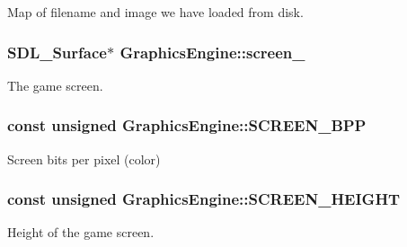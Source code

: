 Map of filename and image we have loaded from disk. 

\hypertarget{classGraphicsEngine_a4d89c081a99c7512a070c9cb77809322}{
\subsubsection[{screen\-\_\-}]{\setlength{\rightskip}{0pt plus 5cm}S\-D\-L\-\_\-\-Surface$\ast$ Graphics\-Engine\-::screen\-\_\-\hspace{0.3cm}{\ttfamily [private]}}}\label{classGraphicsEngine_a4d89c081a99c7512a070c9cb77809322}


The game screen. 

\hypertarget{classGraphicsEngine_a3ff7024552553e73dd9edaef063284e0}{
\subsubsection[{S\-C\-R\-E\-E\-N\-\_\-\-B\-P\-P}]{\setlength{\rightskip}{0pt plus 5cm}const unsigned Graphics\-Engine\-::\-S\-C\-R\-E\-E\-N\-\_\-\-B\-P\-P\hspace{0.3cm}{\ttfamily [private]}}}\label{classGraphicsEngine_a3ff7024552553e73dd9edaef063284e0}


Screen bits per pixel (color) 

\hypertarget{classGraphicsEngine_a22ccc86caef4284dcf8600ef846e3897}{
\subsubsection[{S\-C\-R\-E\-E\-N\-\_\-\-H\-E\-I\-G\-H\-T}]{\setlength{\rightskip}{0pt plus 5cm}const unsigned Graphics\-Engine\-::\-S\-C\-R\-E\-E\-N\-\_\-\-H\-E\-I\-G\-H\-T\hspace{0.3cm}{\ttfamily [private]}}}\label{classGraphicsEngine_a22ccc86caef4284dcf8600ef846e3897}


Height of the game screen. 

